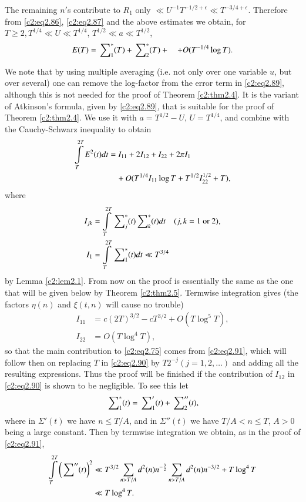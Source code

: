 The remaining $n'$s contribute to $R_1$ only $\ll U^{-1} T^{- 1/2+
  \epsilon} \ll T^{-3/4+ \epsilon}$. Therefore from \eqref{c2:eq2.86},
\eqref{c2:eq2.87} and the above estimates we obtain, for $T\geq 2,
T^{1/4} \ll U \ll T^{1/4}$, $T^{1/2} \ll a \ll T^{1/2}$,
\begin{equation}
  E(T) = \sideset{}{_1^*}\sum (T) + \sideset{}{_2^*}\sum(T) + \quad +
  O(T^{-1/4} \log T).\label{c2:eq2.89}
\end{equation}

We note that by using multiple averaging (i.e. not only over one
variable $u$, but over several) one can remove the log-factor from the
error term in \eqref{c2:eq2.89}, although this is not needed for the
proof of Theorem \ref{c2:thm2.4}. It is the variant of Atkinson's
formula, given by \eqref{c2:eq2.89}, that is suitable for the proof of
Theorem \ref{c2:thm2.4}. We use it with $a= T^{1/2} - U$, $U=T^{1/4}$,
and combine with the Cauchy-Schwarz inequality to obtain
\begin{align}
  \int\limits_T^{2T} E^2 (t) dt &= I_{11} + 2 I_{12} + I_{22} + 2 \pi
  I_1\notag\\
&\quad + O(T^{1/4} I_{11} \log T + T^{1/2} I^{1/2}_{22} +
  T),\label{c2:eq2.90} 
\end{align}
where\pageoriginale
\begin{align*}
  I_{jk} & = \int\limits_T^{2T} \sideset{}{_j^*}\sum (t)
  \sideset{}{_k^*}\sum (t) dt \quad (j, k =1 ~\text{or}~ 2),\\
  I_1 & = \int\limits_T^{2T} \sideset{}{_1^*}\sum (t) dt \ll T^{3/4}
\end{align*}
by Lemma \ref{c2:lem2.1}. From now on the proof is essentially the
same as the one that will be given below by Theorem
\ref{c2:thm2.5}. Termwise integration gives (the factors $\eta(n)$ and
$\xi (t, n)$ will cause no trouble)
\begin{align}
  I_{11} & = c(2 T)^{3/2} - cT^{3/2}+ O(T \log^5 T),\label{c2:eq2.91}\\
  I_{22} & = O(T \log^4 T),\label{c2:eq2.92}
\end{align}
so that the main contribution to \eqref{c2:eq2.75} comes from
\eqref{c2:eq2.91}, which will follow then on replacing $T$ in
\eqref{c2:eq2.90} by $T2^{-j} (j= 1, 2, \ldots)$ and adding all the
resulting expressions. Thus the proof will be finished if the
contribution of $I_{12}$ in \eqref{c2:eq2.90} is shown to be
negligible. To see this let
$$
\sideset{}{_1^*}\sum (t) = \sideset{}{_1'}\sum(t) +
\sideset{}{_2''}\sum (t),
$$
where in $\Sigma'(t)$ we have $n \leq T/A$, and in $\Sigma''(t)$ we
have $T/A < n \leq T$, $A > 0$ being a large constant. Then by
termwise integration we obtain, as in the proof of \eqref{c2:eq2.91},
\begin{align}
  \int\limits_T^{2T} \left(\sideset{}{''}\sum (t)\right)^2 & \ll T^{3/2}
  \sum_{n > T/A} d^2 (n) n^{-\frac{3}{2}} \sum_{n > T/A} d^2 (n) n^{-3/2} + T
  \log^4 T\notag\\ 
  & \ll T \log^4 T.\label{c2:eq2.93}
\end{align}

